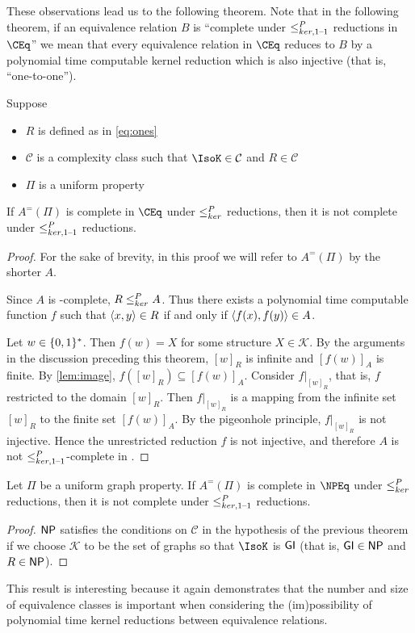 These observations lead us to the following theorem.
Note that in the following theorem, if an equivalence relation $B$ is ``complete under $\leq^{P}_{ker,1\text{--}1}$ reductions in $\CEq$'' we mean that every equivalence relation in $\CEq$ reduces to $B$ by a polynomial time computable kernel reduction which is also injective (that is, ``one-to-one'').

\begin{theorem}
  Suppose
  \begin{itemize}
  \item $R$ is defined as in \eqref{eq:ones}
  \item $\mathcal{C}$ is a complexity class such that $\IsoK\in\mathcal{C}$ and $R\in\mathcal{C}$
  \item $\Pi$ is a uniform property
  \end{itemize}
  If $A^=(\Pi)$ is complete in $\CEq$ under $\leq^{P}_{ker}$ reductions, then it is not complete under $\leq^{P}_{ker,1\text{--}1}$ reductions.
\end{theorem}
\begin{proof}
  For the sake of brevity, in this proof we will refer to $A^=(\Pi)$ by the shorter $A$.

  Since $A$ is \CEq-complete, $R\leq^{P}_{ker} A$.
  Thus there exists a polynomial time computable function $f$ such that $\left\langle x,y\right\rangle\in R$ if and only if $\left\langle f(x),f(y)\right\rangle\in A$.

  Let $w\in\{0, 1\}^{*}$.
  Then $f(w)=X$ for some structure $X\in\mathcal{K}$.
  By the arguments in the discussion preceding this theorem, $[w]_R$ is infinite and $[f(w)]_A$ is finite.
  By \autoref{lem:image}, $f([w]_R)\subseteq [f(w)]_A$.
  Consider $f|_{[w]_R}$, that is, $f$ restricted to the domain $[w]_R$.
  Then $f|_{[w]_R}$ is a mapping from the infinite set $[w]_R$ to the finite set $[f(w)]_A$.
  By the pigeonhole principle, $f|_{[w]_R}$ is not injective.
  Hence the unrestricted reduction $f$ is not injective, and therefore $A$ is not $\leq^{P}_{ker,1\text{--}1}$-complete in \CEq.
\end{proof}

\begin{corollary}
  Let $\Pi$ be a uniform graph property.
  If $A^=(\Pi)$ is complete in $\NPEq$ under $\leq^{P}_{ker}$ reductions, then it is not complete under $\leq^{P}_{ker,1\text{--}1}$ reductions.
\end{corollary}
\begin{proof}
  ${\mathsf{NP}}$ satisfies the conditions on $\mathcal{C}$ in the hypothesis of the previous theorem if we choose $\mathcal{K}$ to be the set of graphs so that $\IsoK$ is ${\mathsf{GI}}$ (that is, ${\mathsf{GI}}\in{\ensuremath{\mathsf{NP}}}$ and $R\in{\ensuremath{\mathsf{NP}}}$).
\end{proof}

This result is interesting because it again demonstrates that the number and size of equivalence classes is important when considering the (im)possibility of polynomial time kernel reductions between equivalence relations.
